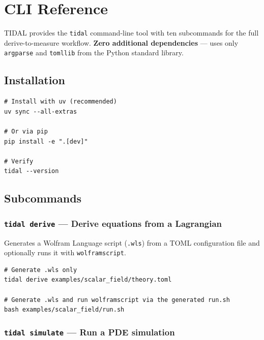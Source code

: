 
\section{CLI Reference}
\label{sec:cli-reference}

TIDAL provides the \texttt{tidal} command-line tool with ten subcommands for the full derive-to-measure workflow.
\textbf{Zero additional dependencies} --- uses only \texttt{argparse} and \texttt{tomllib} from the Python standard library.

\subsection{Installation}

\begin{lstlisting}[style=bash]
# Install with uv (recommended)
uv sync --all-extras

# Or via pip
pip install -e ".[dev]"

# Verify
tidal --version
\end{lstlisting}

\subsection{Subcommands}

\subsubsection{\texttt{tidal derive} --- Derive equations from a Lagrangian}

Generates a Wolfram Language script (\texttt{.wls}) from a TOML configuration file and optionally runs it with \texttt{wolframscript}.

\begin{lstlisting}[style=bash]
# Generate .wls only
tidal derive examples/scalar_field/theory.toml

# Generate .wls and run wolframscript via the generated run.sh
bash examples/scalar_field/run.sh
\end{lstlisting}

\subsubsection{\texttt{tidal simulate} --- Run a PDE simulation}

